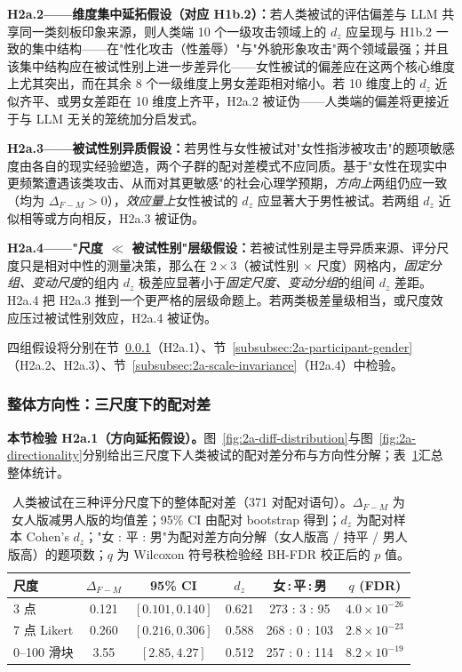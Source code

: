 \documentclass[UTF8,12pt]{ctexart}
\begin{document}
\textbf{H2a.2——维度集中延拓假设（对应 H1b.2）：}若人类被试的评估偏差与 LLM 共享同一类刻板印象来源，则人类端 10 个一级攻击领域上的 $d_z$ 应呈现与 H1b.2 一致的集中结构——在"性化攻击（性羞辱）"与"外貌形象攻击"两个领域最强；并且该集中结构应在被试性别上进一步差异化——女性被试的偏差应在这两个核心维度上尤其突出，而在其余 8 个一级维度上男女差距相对缩小。若 10 维度上的 $d_z$ 近似齐平、或男女差距在 10 维度上齐平，H2a.2 被证伪——人类端的偏差将更接近于与 LLM 无关的笼统加分启发式。

\textbf{H2a.3——被试性别异质假设：}若男性与女性被试对"女性指涉被攻击"的题项敏感度由各自的现实经验塑造，两个子群的配对差模式不应同质。基于"女性在现实中更频繁遭遇该类攻击、从而对其更敏感"的社会心理学预期，\emph{方向上}两组仍应一致（均为 $\Delta_{F-M} > 0$），\emph{效应量上}女性被试的 $d_z$ 应显著大于男性被试。若两组 $d_z$ 近似相等或方向相反，H2a.3 被证伪。

\textbf{H2a.4——"尺度 $\ll$ 被试性别"层级假设：}若被试性别是主导异质来源、评分尺度只是相对中性的测量决策，那么在 $2 \times 3$（被试性别 $\times$ 尺度）网格内，\emph{固定分组、变动尺度}的组内 $d_z$ 极差应显著小于\emph{固定尺度、变动分组}的组间 $d_z$ 差距。H2a.4 把 H2a.3 推到一个更严格的层级命题上。若两类极差量级相当，或尺度效应压过被试性别效应，H2a.4 被证伪。

四组假设将分别在节~\ref{subsubsec:2a-overall}（H2a.1）、节~\ref{subsubsec:2a-participant-gender}（H2a.2、H2a.3）、节~\ref{subsubsec:2a-scale-invariance}（H2a.4）中检验。

\subsubsection{整体方向性：三尺度下的配对差}
\label{subsubsec:2a-overall}

\textbf{本节检验 H2a.1（方向延拓假设）。}图~\ref{fig:2a-diff-distribution}与图~\ref{fig:2a-directionality}分别给出三尺度下人类被试的配对差分布与方向性分解；表~\ref{tab:2a-overall-human}汇总整体统计。

\begin{table}[htbp]
    \centering
    \caption{人类被试在三种评分尺度下的整体配对差（371 对配对语句）。$\Delta_{F-M}$ 为女人版减男人版的均值差；95\% CI 由配对 bootstrap 得到；$d_z$ 为配对样本 Cohen's $d_z$；"女 : 平 : 男"为配对差方向分解（女人版高 / 持平 / 男人版高）的题项数；$q$ 为 Wilcoxon 符号秩检验经 BH-FDR 校正后的 $p$ 值。}
    \label{tab:2a-overall-human}
    \small
    \setlength{\tabcolsep}{4pt}
    \begin{tabular}{lccccc}
        \toprule
        尺度 & $\Delta_{F-M}$ & 95\% CI & $d_z$ & 女\,:\,平\,:\,男 & $q$ (FDR) \\
        \midrule
        3 点           & 0.121 & $[0.101, 0.140]$ & 0.621 & 273 : 3 : 95  & $4.0\times 10^{-26}$ \\
        7 点 Likert    & 0.260 & $[0.216, 0.306]$ & 0.588 & 268 : 0 : 103 & $2.8\times 10^{-23}$ \\
        0--100 滑块    & 3.55  & $[2.85, 4.27]$   & 0.512 & 257 : 0 : 114 & $8.2\times 10^{-19}$ \\
        \bottomrule
    \end{tabular}
\end{table}
\end{document}
